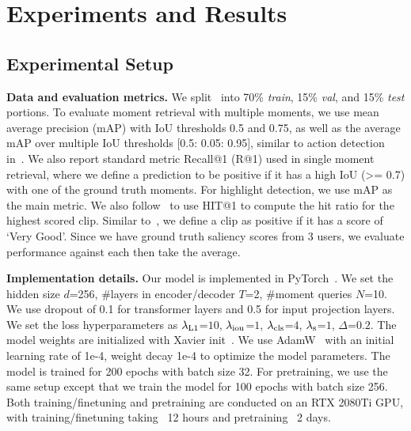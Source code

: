 \section{Experiments and Results}

\subsection{Experimental Setup}\label{sec:experiment_setup}
\textbf{Data and evaluation metrics.}
We split \DatasetName~into 70\% \textit{train}, 15\% \textit{val}, and 15\% \textit{test} portions.
To evaluate moment retrieval with multiple moments, we use mean average precision (mAP) with IoU thresholds 0.5 and 0.75, as well as the average mAP over multiple IoU thresholds [0.5: 0.05: 0.95], similar to action detection in~\cite{caba2015activitynet}.
We also report standard metric Recall@1 (R@1) used in single moment retrieval, where we define a prediction to be positive if it has a high IoU (>= 0.7) with one of the ground truth moments. 
For highlight detection, we use mAP as the main metric. 
We also follow~\cite{liu2015multi} to use HIT@1 to compute the hit ratio for the highest scored clip.
Similar to~\cite{liu2015multi}, we define a clip as positive if it has a score of `Very Good'.
Since we have ground truth saliency scores from 3 users, we evaluate performance against each then take the average. 

\textbf{Implementation details.}
Our model is implemented in PyTorch~\cite{paszke2019pytorch}. We set the hidden size $d$=256, \#layers in encoder/decoder $T$=2, \#moment queries $N$=10.
We use dropout of 0.1 for transformer layers and 0.5 for input projection layers.
We set the loss hyperparameters as $\lambda_{\rm L1}$=$10$, $\lambda_{\rm iou}$=$1$, $\lambda_{\rm cls}$=$4$, $\lambda_{\rm s}$=$1$, $\Delta$=$0.2$. 
The model weights are initialized with Xavier init~\cite{glorot2010understanding}.
We use AdamW~\cite{loshchilov2017decoupled} with an initial learning rate of 1e-4, weight decay 1e-4 to optimize the model parameters.
The model is trained for 200 epochs with batch size 32.
For pretraining, we use the same setup except that we train the model for 100 epochs with batch size 256. 
Both training/finetuning and pretraining are conducted on an RTX 2080Ti GPU, with training/finetuning taking ~12 hours and pretraining ~2 days.



